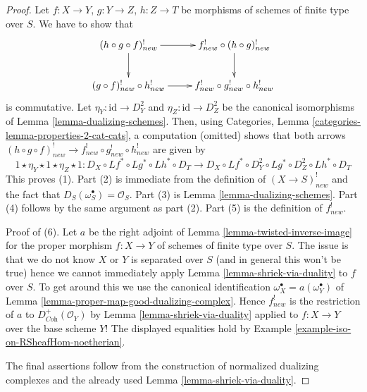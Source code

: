 \begin{proof}
Let $f : X \to Y$, $g : Y \to Z$, $h : Z \to T$ be morphisms of schemes
of finite type over $S$. We have to show that
$$
\xymatrix{
(h \circ g \circ f)^!_{new} \ar[r] \ar[d] &
f^!_{new} \circ (h \circ g)^!_{new} \ar[d] \\
(g \circ f)^!_{new} \circ h^!_{new} \ar[r] &
f^!_{new} \circ g^!_{new} \circ h^!_{new}
}
$$
is commutative. Let $\eta_Y : \text{id} \to D_Y^2$
and $\eta_Z : \text{id} \to D_Z^2$ be the canonical isomorphisms
of Lemma \ref{lemma-dualizing-schemes}. Then, using
Categories, Lemma \ref{categories-lemma-properties-2-cat-cats},
a computation (omitted) shows that both arrows
$(h \circ g \circ f)^!_{new} \to f^!_{new} \circ g^!_{new} \circ h^!_{new}$
are given by
$$
1 \star \eta_Y \star 1 \star \eta_Z \star 1 :
D_X \circ Lf^* \circ Lg^* \circ Lh^* \circ D_T
\longrightarrow
D_X \circ Lf^* \circ D_Y^2 \circ Lg^* \circ D_Z^2 \circ Lh^* \circ D_T
$$
This proves (1). Part (2) is immediate from the definition of
$(X \to S)^!_{new}$ and the fact that $D_S(\omega_S^\bullet) = \mathcal{O}_S$.
Part (3) is Lemma \ref{lemma-dualizing-schemes}.
Part (4) follows by the same argument as part (2).
Part (5) is the definition of $f^!_{new}$.

\medskip\noindent
Proof of (6). Let $a$ be the
right adjoint of Lemma \ref{lemma-twisted-inverse-image} for the
proper morphism $f : X \to Y$ of schemes of finite type over $S$.
The issue is that we do not know $X$ or $Y$ is
separated over $S$ (and in general this won't be true)
hence we cannot immediately apply
Lemma \ref{lemma-shriek-via-duality} to $f$ over $S$.
To get around this we use the canonical identification
$\omega_X^\bullet = a(\omega_Y^\bullet)$ of
Lemma \ref{lemma-proper-map-good-dualizing-complex}.
Hence $f^!_{new}$ is the restriction of $a$ to
$D_{\textit{Coh}}^+(\mathcal{O}_Y)$ by Lemma \ref{lemma-shriek-via-duality}
applied to $f : X \to Y$ over the base scheme $Y$!
The displayed equalities hold by
Example \ref{example-iso-on-RSheafHom-noetherian}.

\medskip\noindent
The final assertions follow from the construction of normalized
dualizing complexes and the already used Lemma \ref{lemma-shriek-via-duality}.
\end{proof}

